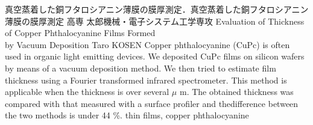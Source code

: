 
\titleAndAbstractAndKeywords
{真空蒸着した銅フタロシアニン薄膜の膜厚測定．真空蒸着した銅フタロシアニン薄膜の膜厚測定}
{高専 太郎}{機械・電子システム工学専攻}
{Evaluation of Thickness of Copper Phthalocyanine Films Formed \\ by Vacuum Deposition}
{Taro KOSEN}
{
Copper phthalocyanine (CuPc) is often used in organic light emitting devices.
We deposited CuPc films on silicon wafers by means of a vacuum deposition method.
We then tried to estimate film thickness using a Fourier transformed infrared spectrometer.
This method is applicable when the thickness is over several $\mu$ m.
The obtained thickness was compared with that measured with a surface profiler and thedifference between the two methods is under 44 \%.
}
{thin films, copper phthalocyanine}

